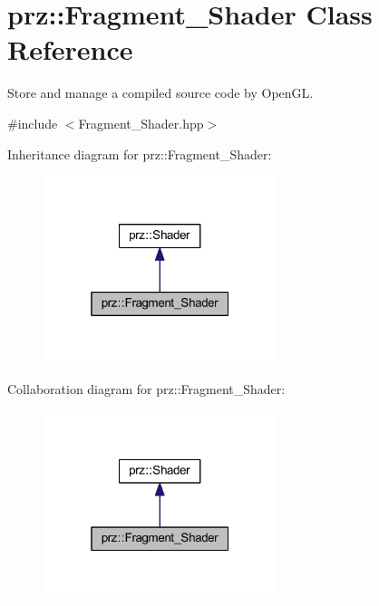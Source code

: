 \hypertarget{classprz_1_1_fragment___shader}{}\section{prz\+::Fragment\+\_\+\+Shader Class Reference}
\label{classprz_1_1_fragment___shader}


Store and manage a compiled source code by Open\+GL.  




{\ttfamily \#include $<$Fragment\+\_\+\+Shader.\+hpp$>$}



Inheritance diagram for prz\+::Fragment\+\_\+\+Shader\+:
\nopagebreak
\begin{figure}[H]
\begin{center}
\leavevmode
\includegraphics[width=193pt]{classprz_1_1_fragment___shader__inherit__graph}
\end{center}
\end{figure}


Collaboration diagram for prz\+::Fragment\+\_\+\+Shader\+:
\nopagebreak
\begin{figure}[H]
\begin{center}
\leavevmode
\includegraphics[width=193pt]{classprz_1_1_fragment___shader__coll__graph}
\end{center}
\end{figure}
